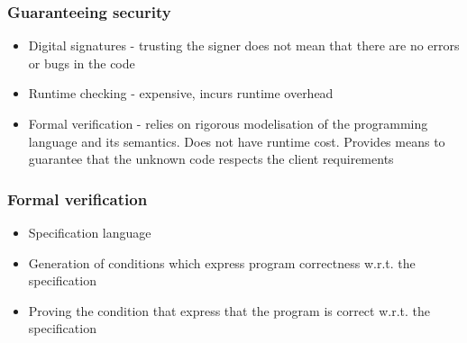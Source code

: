 \documentclass{beamer}
\begin{document}
\begin{frame}\frametitle{Guaranteeing security }
\begin{itemize}
     \item Digital signatures - trusting the signer does not mean that there are no errors or bugs in the code
     \item Runtime checking -  expensive, incurs runtime overhead
     \item Formal verification - relies on rigorous modelisation of the programming language and its semantics.
                          Does not have runtime cost. Provides means to guarantee that the unknown code respects 
			  the client requirements
 \end{itemize}
\end{frame}

\begin{frame}\frametitle{Formal verification}
  \begin{itemize}
    \item Specification language 
    \item Generation of conditions which express program correctness
         w.r.t. the specification
    \item Proving the condition that express that the program 
          is correct w.r.t. the specification
  \end{itemize}

\begin{center}
\end{center}
\end{frame}
\end{document}
